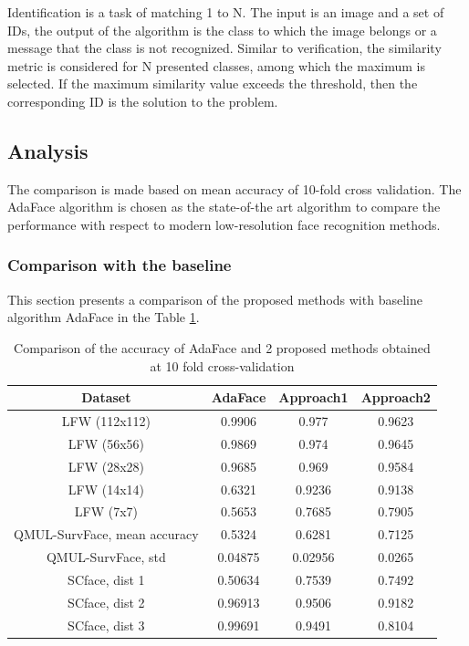 \documentclass[11pt,a4paper]{article}
\begin{document}
Identification is a task of matching 1 to N. The input is an image and a set of IDs, the output of the algorithm is the class to which the image belongs or a message that the class is not recognized. Similar to verification, the similarity metric is considered for N presented classes, among which the maximum is selected. If the maximum similarity value exceeds the threshold, then the corresponding ID is the solution to the problem.

\subsection{Analysis}
The comparison is made based on mean accuracy of 10-fold cross validation. The AdaFace \cite{adaface} algorithm is chosen as the state-of-the art algorithm to compare the performance with respect to modern low-resolution face recognition methods. 

\subsubsection{Comparison with the baseline}
This section presents a comparison of the proposed methods with baseline algorithm AdaFace \cite{adaface} in the Table \ref{t3}.

\begin{table}[ht!]
\begin{center}
\begin{tabular}{||c | c c c||} 
 \hline
 Dataset & AdaFace & Approach1 & Approach2 \\ [0.5ex] 
 \hline\hline
 LFW (112x112) & 0.9906 & 0.977 & 0.9623 \\ 
 \hline
  LFW (56x56) & 0.9869 & 0.974 & 0.9645 \\
 \hline
  LFW (28x28) & 0.9685 & 0.969 & 0.9584 \\
 \hline
  LFW (14x14) & 0.6321 & 0.9236 & 0.9138 \\
 \hline
  LFW (7x7) & 0.5653 & 0.7685 & 0.7905 \\ 
  \hline
  QMUL-SurvFace, mean accuracy & 0.5324 & 0.6281 & 0.7125 \\ 
  \hline
  QMUL-SurvFace, std & 0.04875 & 0.02956 & 0.0265 \\  
 \hline
 SCface, dist 1 &  0.50634 & 0.7539 & 0.7492 \\ 
  \hline
  SCface, dist 2 & 0.96913 & 0.9506 & 0.9182 \\ 
  \hline
  SCface, dist 3 & 0.99691 & 0.9491 & 0.8104 \\ [1ex]
  \hline
\end{tabular}
\caption{Comparison of the accuracy of AdaFace and 2 proposed methods obtained at 10 fold cross-validation}
\label{t3} 
\end{center}
\end{table}
\end{document}
